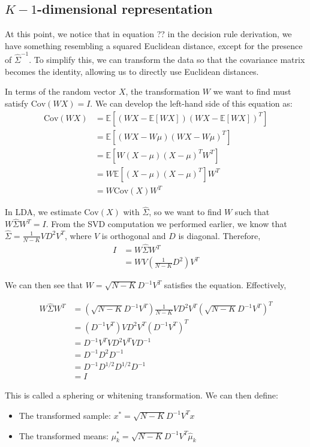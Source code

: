 \documentclass[a4paper,12pt]{article}
\begin{document}
\subsection{$K-1$-dimensional representation}

At this point, we notice that in equation ?? in the decision rule derivation, we have something resembling a squared Euclidean distance, except for the presence of $\hat{\Sigma}^{-1}$. To simplify this, we can transform the data so that the covariance matrix becomes the identity, allowing us to directly use Euclidean distances.

In terms of the random vector $X$, the transformation $W$ we want to find must satisfy $\text{Cov}(WX) = I$. We can develop the left-hand side of this equation as:
\begin{align*}
\text{Cov}(WX) &= \mathbb{E}\left[ (WX - \mathbb{E}[WX])(WX - \mathbb{E}[WX])^T \right] \\
&= \mathbb{E}\left[ (WX - W\mu)(WX - W\mu)^T \right] \\
&= \mathbb{E}\left[ W(X - \mu)(X - \mu)^T W^T \right] \\
&= W \mathbb{E}\left[ (X - \mu)(X - \mu)^T \right] W^T \\
&= W \text{Cov}(X) W^T
\end{align*}

In LDA, we estimate $\text{Cov}(X)$ with $\hat{\Sigma}$, so we want to find $W$ such that $W \hat{\Sigma} W^T = I$. From the SVD computation we performed earlier, we know that $\hat{\Sigma} = \frac{1}{N-K}VD^2V^T$, where $V$ is orthogonal and $D$ is diagonal. Therefore,
\begin{align*}
I & = W \hat{\Sigma} W^T \\
& = W V (\frac{1}{N-K}D^2) V^T
\end{align*}

We can then see that $W = \sqrt{N-K}D^{-1}V^T$ satisfies the equation. Effectively,

\begin{align*}
W \hat{\Sigma} W^T &= (\sqrt{N-K}D^{-1}V^T) \frac{1}{N-K}VD^2V^T (\sqrt{N-K}D^{-1}V^T)^T \\
&= (D^{-1}V^T) VD^2V^T (D^{-1}V^T)^T \\
&= D^{-1}V^T VD^2V^T V D^{-1} \\
&= D^{-1}D^2 D^{-1} \\
&= D^{-1}D^{1/2} D^{1/2} D^{-1} \\
& = I
\end{align*}


This is called a sphering or whitening transformation. We can then define:
\begin{itemize}
    \item The transformed sample: $x^* = \sqrt{N-K}D^{-1}V^Tx$
    \item The transformed means: $\mu_k^* = \sqrt{N-K}D^{-1}V^T\hat{\mu}_k$
\end{itemize}
\end{document}
